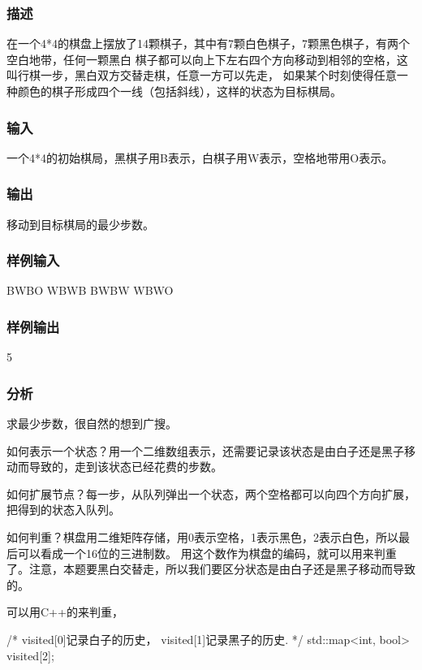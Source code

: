 \subsubsection{描述}
在一个4*4的棋盘上摆放了14颗棋子，其中有7颗白色棋子，7颗黑色棋子，有两个空白地带，任何一颗黑白
棋子都可以向上下左右四个方向移动到相邻的空格，这叫行棋一步，黑白双方交替走棋，任意一方可以先走，
如果某个时刻使得任意一种颜色的棋子形成四个一线（包括斜线），这样的状态为目标棋局。

\subsubsection{输入}
一个4*4的初始棋局，黑棋子用B表示，白棋子用W表示，空格地带用O表示。

\subsubsection{输出}
移动到目标棋局的最少步数。

\subsubsection{样例输入}
\begin{Code}
BWBO
WBWB
BWBW
WBWO
\end{Code}

\subsubsection{样例输出}
\begin{Code}
5
\end{Code}

\subsubsection{分析}
求最少步数，很自然的想到广搜。

如何表示一个状态？用一个二维数组表示，还需要记录该状态是由白子还是黑子移动而导致的，走到该状态已经花费的步数。

如何扩展节点？每一步，从队列弹出一个状态，两个空格都可以向四个方向扩展，把得到的状态入队列。

如何判重？棋盘用二维矩阵存储，用0表示空格，1表示黑色，2表示白色，所以最后可以看成一个16位的三进制数。
用这个数作为棋盘的编码，就可以用来判重了。注意，本题要黑白交替走，所以我们要区分状态是由白子还是黑子移动而导致的。

可以用C++的来判重，
\begin{Code}
/* visited[0]记录白子的历史， visited[1]记录黑子的历史. */
std::map<int, bool> visited[2];
\end{Code}

